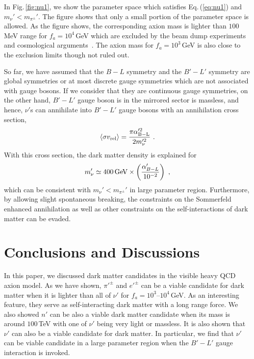 \documentclass[aps,amsmath,preprint,epsf,superscriptaddress,nofootinbib,notitlepage]{revtex4-1}
\begin{document}
In Fig.\,\ref{fig:nu1}, we show the parameter space which satisfies Eq.\,(\ref{eq:nu1}) and $m_{\nu}' < m_{\pi^\pm}'$.
The figure shows that only a small portion of the parameter space  is allowed.
As the figure shows, the corresponding axion mass is lighter than $100$\,MeV range for $f_a = 10^4$\,GeV
which are excluded by the beam dump experiments and cosmological arguments~\cite{Fukuda:2015ana}.
The axion mass for $f_a = 10^3$\,GeV is also close to the exclusion limits though not ruled out.

So far, we have assumed that the $B-L$ symmetry and  the $B'-L'$ symmetry are global symmetries
or at most discrete gauge symmetries which are not associated with gauge bosons.
If we consider that they are continuous gauge symmetries, on the other hand, $B'-L'$ gauge boson is in the mirrored 
sector is massless, and hence, $\nu'$s can annihilate into  $B'-L'$ gauge bosons
with an annihilation cross section,
\begin{eqnarray}
\vev{\sigma v_{\rm rel}} = \frac{\pi \alpha_{\rm B-L}'^2}{2m_{\nu}'^2}\ .
\end{eqnarray}
With this cross section, the dark matter density is explained for 
\begin{eqnarray}
m_\nu' \simeq 400\,{\rm GeV} \times \left(\frac{\alpha_{B-L}'}{10^{-2}}\right)\ ,
\end{eqnarray}
which can be consistent with $m_{\nu}' < m_{\pi^\pm}'$ in large parameter region.
Furthermore, by allowing  slight spontaneous breaking, the constraints on the 
Sommerfeld enhanced annihilation as well as  other constraints on the self-interactions of dark matter
can be evaded.

\section{Conclusions and Discussions}
\label{sec:conclusions}
In this paper, we discussed dark matter candidates in the visible heavy QCD axion model.
As we have shown, $\pi'^\pm$ and $e'^\pm$ 
can be a viable candidate for dark matter when it is lighter than all of $\nu'$
for $f_a = 10^{3}$--$10^4$\,GeV.
As an interesting feature, they serve as self-interacting dark matter with a long range force.
We also showed  $n'$ can be also a viable dark matter candidate when 
its mass is around $100$\,TeV with one of $\nu'$ being very light or massless.
It is also shown that $\nu'$ can also be a viable candidate for dark matter.
In particular, we find that $\nu'$ can be viable candidate in a large parameter region
when the $B'-L'$ gauge interaction is invoked.
\end{document}
